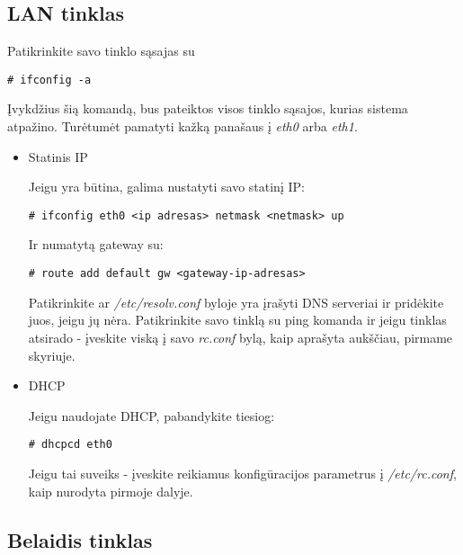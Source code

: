     \subsection{LAN tinklas}

      Patikrinkite savo tinklo sąsajas su

      \begin{verbatim}
# ifconfig -a
      \end{verbatim}

      Įvykdžius šią komandą, bus pateiktos visos tinklo sąsajos,
      kurias sistema atpažino. Turėtumėt pamatyti kažką panašaus į
      \textsl{eth0} arba \textsl{eth1}.

      \begin{itemize}
        \item Statinis IP

          Jeigu yra būtina, galima nustatyti savo statinį IP:

          \begin{verbatim}
# ifconfig eth0 <ip adresas> netmask <netmask> up
          \end{verbatim}

          Ir numatytą gateway su:

          \begin{verbatim}
# route add default gw <gateway-ip-adresas>
          \end{verbatim}

          Patikrinkite ar \textsl{/etc/resolv.conf} byloje yra įrašyti
          DNS serveriai ir pridėkite juos, jeigu jų nėra. Patikrinkite
          savo tinklą su ping komanda ir jeigu tinklas atsirado -
          įveskite viską į savo \textsl{rc.conf} bylą, kaip aprašyta
          aukščiau, pirmame skyriuje.

        \item DHCP

          Jeigu naudojate DHCP, pabandykite tiesiog:

          \begin{verbatim}
# dhcpcd eth0
          \end{verbatim}

          Jeigu tai suveiks - įveskite reikiamus konfigūracijos
          parametrus į \textsl{/etc/rc.conf}, kaip nurodyta pirmoje dalyje.
      \end{itemize}

    \subsection{Belaidis tinklas}

